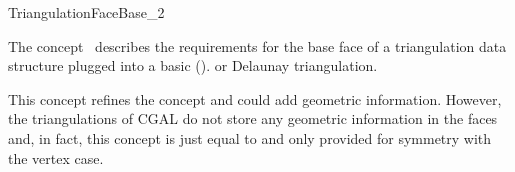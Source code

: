 

\begin{ccRefConcept}{TriangulationFaceBase_2}


\ccDefinition
  
The concept \ccRefName\ describes the requirements for
the base face of a triangulation data structure
plugged into a basic ().
or Delaunay triangulation.

This concept refines the concept 
and could add  geometric information. However, the triangulations of
CGAL do not store any geometric information in the faces
and, in fact, this concept is just equal to 
and only provided for symmetry with the vertex case.


\ccRefines
{}

\ccHasModels
{}


\ccSeeAlso
{} \\
 \\
 \\

\end{ccRefConcept}



